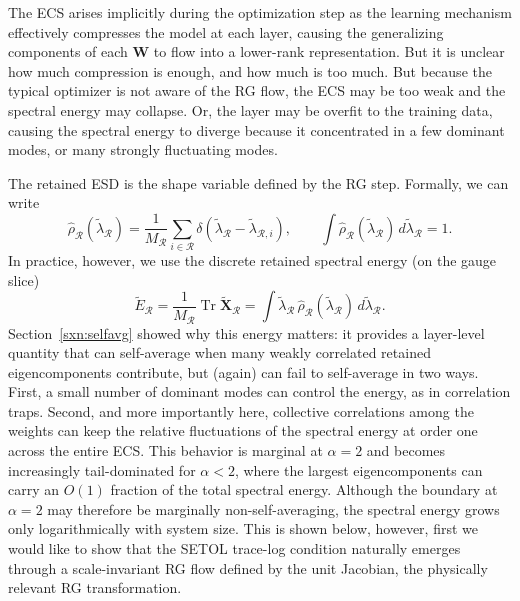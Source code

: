 \documentclass[10pt,twocolumn]{article}
\newcommand{\Tr}{\operatorname{Tr}}
\newcommand{\W}{\mathbf W}
\newcommand{\Xtilde}{\widetilde{\mathbf X}}
\newcommand{\Rell}{\mathcal R}
\newcommand{\rhohat}{\widehat\rho}
\newcommand{\Mred}{M_{\Rell}}
\begin{document}
The ECS arises implicitly during the optimization step as the learning mechanism effectively
compresses the model at each layer, causing the generalizing components of each $\W$ to flow
into a lower-rank representation.  But it is unclear how much compression is enough,
and how much is too much.
But because the typical optimizer is not aware of the RG flow,
the ECS may be too weak and the spectral energy may collapse.
Or, the layer may be overfit to the training data, causing the spectral energy to diverge
because it concentrated in a few dominant modes, or many strongly fluctuating modes.

The retained ESD is the shape variable defined  by the RG step.  Formally, we can write
\begin{equation}
    \rhohat_{\Rell}(\tilde{\lambda}_{\Rell})
    =
    \frac{1}{\Mred}\sum_{i\in\Rell}\delta(\tilde{\lambda}_{\Rell}-\tilde{\lambda}_{\Rell,i}),
    \qquad
    \int\rhohat_{\Rell}(\tilde{\lambda}_{\Rell})\,d\tilde{\lambda}_{\Rell}=1 .
    \label{eq:prob_esd_operational_v5}
\end{equation}
In practice, however, we use the discrete retained spectral energy (on the gauge slice)
\begin{equation}
    \widetilde E_{\Rell}
    =
    \frac{1}{\Mred}\Tr\Xtilde_{\Rell}
    =
    \int \tilde{\lambda}_{\Rell}\,\rhohat_{\Rell}(\tilde{\lambda}_{\Rell})\,d\tilde{\lambda}_{\Rell} .
    \label{eq:retained_trace_energy_operational_v5}
\end{equation}
Section~\ref{sxn:selfavg} showed why this energy matters: it provides a layer-level quantity that can self-average when many weakly correlated retained eigencomponents contribute, but (again) can fail to self-average in two  ways. First, a small number of dominant modes can control the energy, as in correlation traps. Second, and more importantly here, collective correlations among the weights can keep the relative fluctuations of the spectral energy at order one across the entire ECS. This behavior is marginal at $\alpha=2$ and becomes increasingly tail-dominated for $\alpha<2$, where the largest eigencomponents can carry an $O(1)$ fraction of the total spectral energy. Although the boundary at $\alpha=2$ may therefore be marginally non-self-averaging, the spectral energy grows only logarithmically with system size.  This is shown below, however, first we would like to show that the SETOL trace-log condition naturally emerges
through  a scale-invariant RG flow defined by the unit Jacobian, the physically relevant RG transformation.
\end{document}
